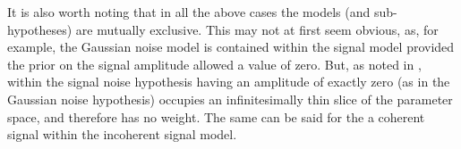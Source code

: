 It is also worth noting that in all the above cases the models (and sub-hypotheses) are mutually exclusive. This may not at first seem obvious, as,
for example, the Gaussian noise model is contained within the signal model provided the prior on the signal amplitude allowed a value of zero. But, as noted in
\citet{2012PhRvD..85h2003L, MaxCWpolariations}, within the signal noise hypothesis having an amplitude of exactly zero (as in the Gaussian
noise hypothesis) occupies an infinitesimally thin slice of the parameter space, and therefore has no weight. The same can be said for the a coherent
signal within the incoherent signal model.
